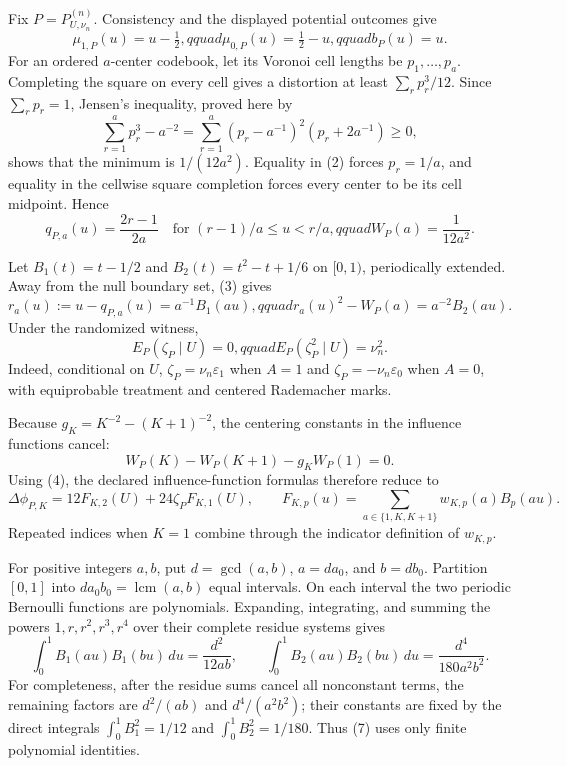 Fix \(P=P_{U,\nu_n}^{(n)}\).  Consistency and the displayed potential outcomes give
\[
 \mu_{1,P}(u)=u-\tfrac12,qquad \mu_{0,P}(u)=\tfrac12-u,qquad b_P(u)=u.          \tag{1}
\]
For an ordered \(a\)-center codebook, let its Voronoi cell lengths be \(p_1,\ldots,p_a\).  Completing the square on every cell gives a distortion at least \(\sum_rp_r^3/12\).  Since \(\sum_rp_r=1\), Jensen's inequality, proved here by
\[
 \sum_{r=1}^a p_r^3-a^{-2}
 =\sum_{r=1}^a(p_r-a^{-1})^2(p_r+2a^{-1})\geq0,                                \tag{2}
\]
shows that the minimum is \(1/(12a^2)\).  Equality in (2) forces \(p_r=1/a\), and equality in the cellwise square completion forces every center to be its cell midpoint.  Hence
\[
 q_{P,a}(u)=\frac{2r-1}{2a}\quad\text{for }(r-1)/a\leq u<r/a,qquad
 W_P(a)=\frac1{12a^2}.                                                            \tag{3}
\]

Let \(B_1(t)=t-1/2\) and \(B_2(t)=t^2-t+1/6\) on \([0,1)\), periodically extended.  Away from the null boundary set, (3) gives
\[
 r_a(u):=u-q_{P,a}(u)=a^{-1}B_1(au),qquad
 r_a(u)^2-W_P(a)=a^{-2}B_2(au).                                                   \tag{4}
\]
Under the randomized witness,
\[
 E_P(\zeta_P\mid U)=0,qquad E_P(\zeta_P^2\mid U)=\nu_n^2.                     \tag{5}
\]
Indeed, conditional on \(U\), \(\zeta_P=\nu_n\varepsilon_1\) when \(A=1\) and \(\zeta_P=-\nu_n\varepsilon_0\) when \(A=0\), with equiprobable treatment and centered Rademacher marks.

Because \(g_K=K^{-2}-(K+1)^{-2}\), the centering constants in the influence functions cancel:
\[
 W_P(K)-W_P(K+1)-g_KW_P(1)=0.
\]
Using (4), the declared influence-function formulas therefore reduce to
\[
 \Delta\phi_{P,K}=12F_{K,2}(U)+24\zeta_PF_{K,1}(U),
 \qquad F_{K,p}(u)=\sum_{a\in\{1,K,K+1\}}w_{K,p}(a)B_p(au).                    \tag{6}
\]
Repeated indices when \(K=1\) combine through the indicator definition of \(w_{K,p}\).

For positive integers \(a,b\), put \(d=\gcd(a,b)\), \(a=da_0\), and \(b=db_0\).  Partition \([0,1]\) into \(da_0b_0=\operatorname{lcm}(a,b)\) equal intervals.  On each interval the two periodic Bernoulli functions are polynomials.  Expanding, integrating, and summing the powers \(1,r,r^2,r^3,r^4\) over their complete residue systems gives
\[
 \int_0^1B_1(au)B_1(bu)\,du=\frac{d^2}{12ab},
 \qquad
 \int_0^1B_2(au)B_2(bu)\,du=\frac{d^4}{180a^2b^2}.                             \tag{7}
\]
For completeness, after the residue sums cancel all nonconstant terms, the remaining factors are \(d^2/(ab)\) and \(d^4/(a^2b^2)\); their constants are fixed by the direct integrals \(\int_0^1B_1^2=1/12\) and \(\int_0^1B_2^2=1/180\).  Thus (7) uses only finite polynomial identities.

